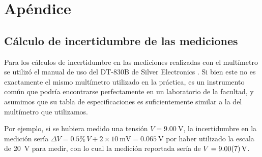 \section{Apéndice}

\subsection{Cálculo de incertidumbre de las mediciones}

Para los cálculos de incertidumbre en las mediciones realizadas con el 
multímetro se utilizó el manual de uso del DT-830B de Silver Electronics
\cite{multimetro}. Si bien este no es exactamente el mismo multímetro
utilizado en la práctica, es un instrumento común que podría encontrarse 
perfectamente en un laboratorio de la facultad, y asumimos que su tabla de
especificaciones es suficientemente similar a la del multímetro que utilizamos.

Por ejemplo, si se hubiera medido una tensión $V = \SI{9.00}{\volt}$, la
incertidumbre en la medición sería
$\Delta V = 0.5\%\, V + 2\times \SI{10}{\milli\volt} = \SI{0.065}{\volt}$ por
haber utilizado la escala de \SI{20}{\volt} para medir, con lo cual la medición
reportada sería de $V = \SI{9.00 \pm 0.07}{\volt}$.
